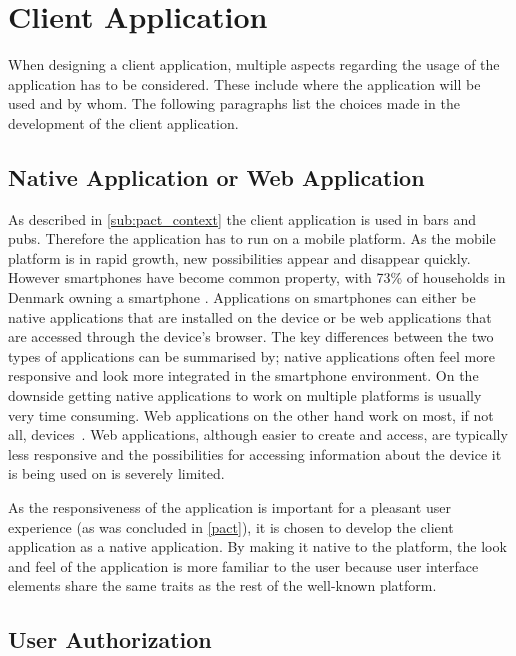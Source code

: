 \section{Client Application}
\label{ssub:client_application}

When designing a client application, multiple aspects regarding the usage of the application has to be considered. These include where the application will be used and by whom. The following paragraphs list the choices made in the development of the client application.

\subsection{Native Application or Web Application}
\label{par:native_application_or_web_application}

As described in \cref{sub:pact_context} the client application is used in bars and pubs. Therefore the application has to run on a mobile platform. As the mobile platform is in rapid growth, new possibilities appear and disappear quickly. However smartphones have become common property, with 73\% of households in Denmark owning a smartphone \cite{smartphone2014}. Applications on smartphones can either be native applications that are installed on the device or be web applications that are accessed through the device's browser. The key differences between the two types of applications can be summarised by; native applications often feel more responsive and look more integrated in the smartphone environment. On the downside  getting native applications to work on multiple platforms is usually very time consuming. Web applications on the other hand work on most, if not all, devices~\cite{charland2011mobile}. Web applications, although easier to create and access, are typically less responsive and the possibilities for accessing information about the device it is being used on is severely limited.

As the responsiveness of the application is important for a pleasant user experience (as was concluded in \cref{pact}), it is chosen to develop the client application as a native application. By making it native to the platform, the look and feel of the application is more familiar to the user because user interface elements share the same traits as the rest of the well-known platform.

\subsection{User Authorization}
\label{par:user_authorization}

